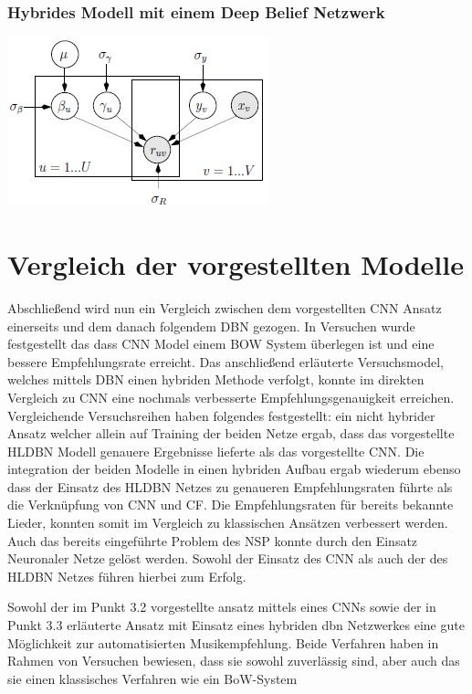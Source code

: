 \documentclass[twosided,a4,10pt]{article}
\begin{document}
\begin{multicols}{2}
		\subsubsection{Hybrides Modell mit einem Deep Belief Netzwerk}
		
		\begin{minipage}{0.45\textwidth}
			\centering
			\includegraphics{img/hybrid.png}
			\label{img:hybrid}
		\end{minipage}
		
		\section{Vergleich der vorgestellten Modelle}
		Abschließend wird nun ein Vergleich zwischen dem vorgestellten CNN Ansatz einerseits und dem danach folgendem DBN gezogen. In Versuchen \cite{oord} wurde festgestellt das dass CNN Model einem BOW System überlegen ist und eine bessere Empfehlungsrate erreicht. Das anschließend erläuterte  Versuchsmodel, welches mittels DBN einen hybriden Methode verfolgt, konnte im direkten Vergleich zu CNN eine nochmals verbesserte Empfehlungsgenauigkeit erreichen. Vergleichende Versuchsreihen \cite{wang} haben folgendes festgestellt: ein nicht hybrider Ansatz welcher allein auf Training der beiden Netze ergab, dass das vorgestellte HLDBN Modell genauere Ergebnisse lieferte als das vorgestellte CNN. Die integration der beiden Modelle in einen hybriden Aufbau ergab wiederum ebenso dass der Einsatz des HLDBN Netzes zu genaueren Empfehlungsraten führte als die Verknüpfung von CNN und CF. Die Empfehlungsraten für bereits bekannte Lieder, konnten somit im Vergleich zu klassischen Ansätzen verbessert werden. Auch das bereits eingeführte Problem des NSP konnte durch den Einsatz Neuronaler Netze gelöst werden.  Sowohl der Einsatz des CNN als auch der des HLDBN Netzes führen hierbei zum Erfolg.
		
		
		
		Sowohl der im Punkt 3.2 vorgestellte ansatz mittels eines CNNs sowie der in Punkt 3.3 erläuterte Ansatz mit Einsatz eines hybriden dbn Netzwerkes eine gute Möglichkeit zur automatisierten Musikempfehlung. Beide Verfahren haben in Rahmen von Versuchen bewiesen, dass sie sowohl zuverlässig sind, aber auch das sie einen klassisches Verfahren wie ein BoW-System 
		
		
		
		
	\end{multicols}
	
\end{document}

